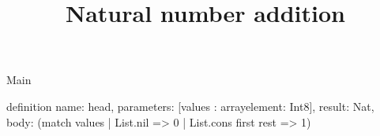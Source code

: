 \begin{lexlean}{Main}
\title{Natural number addition}
\begin{semanticmodule}
definition{
  name: head,
  parameters: [values : array{element: Int8}],
  result: Nat,
  body: (match values
    | List.nil => 0
    | List.cons first rest => 1)
}
\end{semanticmodule}
\end{lexlean}
